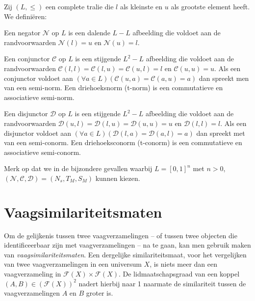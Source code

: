 Zij $(L,\le)$ een complete tralie die $l$ als kleinste en $u$ als grootste element heeft. We
defini\"eren:
\begin{definitie}
Een negator $\mathcal{N}$ op $L$ is een dalende $L - L$ afbeelding die voldoet
aan de randvoorwaarden $\mathcal{N}(l)=u$ en $\mathcal{N}(u)=l$. 
\end{definitie}
\begin{definitie}
Een conjunctor $\mathcal{C}$ op $L$ is een stijgende $L^2 - L$ afbeelding die voldoet aan de
randvoorwaarden $\mathcal{C}(l,l)=\mathcal{C}(l,u)=\mathcal{C}(u,l)=l$ en $\mathcal{C}(u,u)=u$. 
Als een conjunctor voldoet aan 
$(\forall a \in L)(\mathcal{C}(u,a)=\mathcal{C}(a,u)=a)$ dan spreekt men van een semi-norm.
Een driehoeksnorm (t-norm) is een commutatieve en associatieve semi-norm.
\end{definitie}
\begin{definitie}
Een disjunctor $\mathcal{D}$ op $L$ is een stijgende $L^2 - L$ afbeelding die voldoet
aan de randvoorwaarden $\mathcal{D}(u,l)=\mathcal{D}(l,u)=\mathcal{D}(u,u)=u$ en 
$\mathcal{D}(l,l)=l$. Als een disjunctor voldoet aan 
$(\forall a \in L)(\mathcal{D}(l,a)=\mathcal{D}(a,l)=a)$ dan spreekt met van een semi-conorm.
Een driehoeksconorm (t-conorm) is een commutatieve en associatieve semi-conorm.
\end{definitie}

Merk op dat we in de bijzondere gevallen waarbij $L=[0,1]^n$ met $n > 0$, 
$(\mathcal{N},\mathcal{C},\mathcal{D})=(N_s,T_M,S_M)$ kunnen kiezen.


\section{Vaagsimilariteitsmaten}
\label{sectie:vaagsimilariteitsmaten}

Om de gelijkenis tussen twee vaagverzamelingen -- of tussen twee objecten die identificeerbaar 
zijn met vaagverzamelingen -- na te gaan, kan men gebruik maken van \emph{vaagsimilariteitsmaten}. 
Een dergelijke similariteitsmaat, voor het vergelijken van twee vaagverzamelingen in een 
universum $X$, is niets meer dan een vaagverzameling in $\mathcal{F}(X) \times \mathcal{F}(X)$. De 
lidmaatschapsgraad van een koppel $(A,B) \in (\mathcal{F}(X))^2$ nadert hierbij naar 1 naarmate 
de similariteit tussen de vaagverzamelingen $A$ en $B$ groter is.

